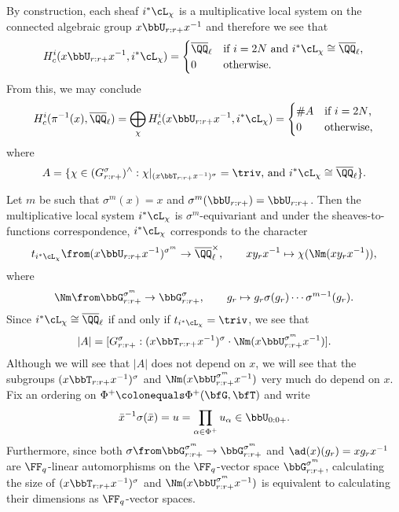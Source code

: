 By construction, each sheaf $i^* \cL_\chi$ is a multiplicative local system on the connected algebraic group $x \bbU_{r:r+} x^{-1}$ and therefore we see that
\begin{equation*}
  H_c^i(x \bbU_{r:r+} x^{-1}, i^* \cL_\chi) = \begin{cases}
    \overline \QQ_\ell & \text{if $i = 2N$ and $i^* \cL_\chi \cong \overline \QQ_\ell$,} \\
    0 & \text{otherwise.}
  \end{cases}
\end{equation*}
From this, we may conclude
\begin{equation}\label{eq:fiber cohomology}
  H_c^i(\pi^{-1}(x), \overline \QQ_\ell) = \bigoplus_\chi H_c^i(x \bbU_{r:r+} x^{-1}, i^* \cL_\chi) = \begin{cases}
    \#A & \text{if $i = 2N$,} \\
    0 & \text{otherwise,}
  \end{cases}
\end{equation}
where
\begin{equation*}
  A = \{\chi \in (G_{r:r+}^\sigma)^\wedge : \text{$\chi|_{(x\bbT_{r:r+} x^{-1})^\sigma} = \triv$, and $i^* \cL_\chi \cong \overline \QQ_\ell$}\}.
\end{equation*}

Let $m$ be such that $\sigma^m(x) = x$ and $\sigma^m(\bbU_{r:r+}) = \bbU_{r:r+}$. Then the multiplicative local system $i^* \cL_\chi$ is $\sigma^m$-equivariant and under the sheaves-to-functions correspondence, $i^* \cL_\chi$ corresponds to the character
  \begin{equation*}
    t_{i^* \cL_\chi} \from (x \bbU_{r:r+} x^{-1})^{\sigma^m} \to \overline \QQ_\ell^\times, \qquad x y_r x^{-1} \mapsto \chi(\Nm(xy_rx^{-1})),
  \end{equation*}
  where
  \begin{equation*}
    \Nm \from\bbG_{r:r+}^{\sigma^m} \to\bbG_{r:r+}^{\sigma}, \qquad g_r \mapsto g_r \sigma(g_r) \cdots \sigma^{m-1}(g_r).
  \end{equation*}
  Since $i^* \cL_\chi \cong \overline \QQ_\ell$ if and only if $t_{i^* \cL_\chi} = \triv$, we see that
  \begin{equation*}
    |A| = [G_{r:r+}^\sigma : (x\bbT_{r:r+}x^{-1})^\sigma \cdot \Nm(x \bbU_{r:r+}^{\sigma^m} x^{-1})].
  \end{equation*}
  Although we will see that $|A|$ does not depend on $x$, we will see that the subgroups $(x\bbT_{r:r+}x^{-1})^\sigma$ and $\Nm(x \bbU_{r:r+}^{\sigma^m} x^{-1})$ very much do depend on $x$. Fix an ordering on $\Phi^+ \colonequals \Phi^+(\bfG,\bfT)$ and write
  \begin{equation*}
    \bar x^{-1} \sigma(\bar x) = u = \prod_{\alpha \in \Phi^+} u_\alpha \in \bbU_{0:0+}.
  \end{equation*}
  Furthermore, since both $\sigma \from\bbG_{r:r+}^{\sigma^m} \to\bbG_{r:r+}^{\sigma^m}$ and $\ad(x)(g_r) = x g_r x^{-1}$ are $\FF_q$-linear automorphisms on the $\FF_q$-vector space $\bbG_{r:r+}^{\sigma^m}$, calculating the size of $(x\bbT_{r:r+} x^{-1})^\sigma$ and $\Nm(x \bbU_{r:r+}^{\sigma^m} x^{-1})$ is equivalent to calculating their dimensions as $\FF_q$-vector spaces.

